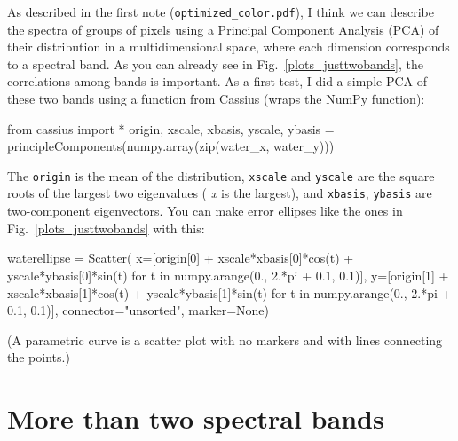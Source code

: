 \documentclass[12pt]{article}
\begin{document}
As described in the first note ({\tt optimized\_color.pdf}), I think
we can describe the spectra of groups of pixels using a Principal
Component Analysis (PCA) of their distribution in a multidimensional
space, where each dimension corresponds to a spectral band.  As you
can already see in Fig.~\ref{plots_justtwobands}, the correlations
among bands is important.  As a first test, I did a simple PCA of these two
bands using a function from Cassius (wraps the NumPy function):
\begin{python}
from cassius import *
origin, xscale, xbasis, yscale, ybasis =
        principleComponents(numpy.array(zip(water_x, water_y)))
\end{python}
The {\tt origin} is the mean of the distribution, {\tt xscale} and
{\tt yscale} are the square roots of the largest two eigenvalues ({\it
  x} is the largest), and {\tt xbasis}, {\tt ybasis} are two-component
eigenvectors.  You can make error ellipses like the ones in
Fig.~\ref{plots_justtwobands} with this:
\begin{python}
waterellipse = Scatter(
    x=[origin[0] + xscale*xbasis[0]*cos(t) + yscale*ybasis[0]*sin(t)
              for t in numpy.arange(0., 2.*pi + 0.1, 0.1)],
    y=[origin[1] + xscale*xbasis[1]*cos(t) + yscale*ybasis[1]*sin(t)
              for t in numpy.arange(0., 2.*pi + 0.1, 0.1)],
    connector="unsorted", marker=None)
\end{python}
(A parametric curve is a scatter plot with no markers and with lines
connecting the points.)

\section{More than two spectral bands}
\end{document}
